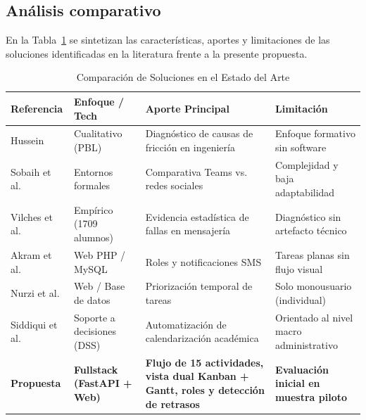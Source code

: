 \documentclass[conference]{IEEEtran}
\begin{document}
\subsection{Análisis comparativo}
En la Tabla~\ref{tab:comparativa} se sintetizan las características, aportes y limitaciones de las soluciones identificadas en la literatura frente a la presente propuesta.

\begin{table}[htbp]
\caption{Comparación de Soluciones en el Estado del Arte}
\label{tab:comparativa}
\centering
\begin{tabular}{p{1.4cm}p{1.7cm}p{2.3cm}p{1.7cm}}
\toprule
\textbf{Referencia} & \textbf{Enfoque / Tech} & \textbf{Aporte Principal} & \textbf{Limitación} \\
\midrule
Hussein \cite{hussein2021addressing} & Cualitativo (PBL) & Diagnóstico de causas de fricción en ingeniería & Enfoque formativo sin software \\
Sobaih et al. \cite{sobaih2021responses} & Entornos formales & Comparativa Teams vs. redes sociales & Complejidad y baja adaptabilidad \\
Vilches et al. \cite{vilches2019limitaciones} & Empírico (1709 alumnos) & Evidencia estadística de fallas en mensajería & Diagnóstico sin artefacto técnico \\
Akram et al. \cite{akram2024gams} & Web PHP / MySQL & Roles y notificaciones SMS & Tareas planas sin flujo visual \\
Nurzi et al. \cite{nurzi2022task} & Web / Base de datos & Priorización temporal de tareas & Solo monousuario (individual) \\
Siddiqui et al. \cite{siddiqui2018gdss} & Soporte a decisiones (DSS) & Automatización de calendarización académica & Orientado al nivel macro administrativo \\
\midrule
\textbf{Propuesta} & \textbf{Fullstack (FastAPI + Web)} & \textbf{Flujo de 15 actividades, vista dual Kanban + Gantt, roles y detección de retrasos} & \textbf{Evaluación inicial en muestra piloto} \\
\bottomrule
\end{tabular}
\end{table}
\end{document}
